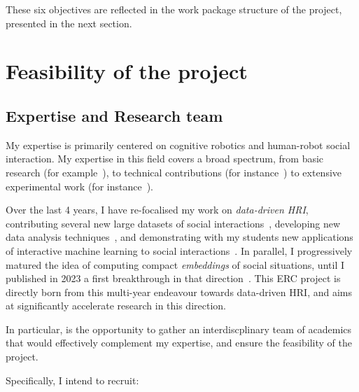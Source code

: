 These six objectives are reflected in the work package structure of the project,
presented in the next section.


\section{Feasibility of the project}


\subsection{Expertise and Research team}
\label{research-team}

My expertise is primarily centered on cognitive robotics and human-robot social
interaction. My expertise in this field covers a broad spectrum, from basic
research (for
example~\cite{lemaignan2014dynamics,lemaignan2015mutual,irfan2018social,winkle2019effective,bartlett2019what}),
to technical contributions (for instance~\cite{lemaignan2010oro,
lemaignan2017artificial, lemaignan2018underworlds})
to extensive experimental work (for instance~\cite{hood2015cowriter,winkle2020couch,
lemaignan2022social}).

Over the last 4 years, I have re-focalised my work on \emph{data-driven HRI},
contributing several new large datasets of social
interactions~\cite{lemaignan2018pinsoro,sallami2020unexpected,webb2023sogrin},
developing new data analysis
techniques~\cite{bartlett2019what,webb2022measuring}, and demonstrating with my
students new applications of interactive machine learning to social
interactions~\cite{senft2016sparc,winkle2020couch,winkle2021leador}.
In parallel, I progressively matured the idea of computing compact
\emph{embeddings} of social situations, until I published in 2023 a first
breakthrough in that direction~\cite{lemaignan2024social}. This ERC project is
directly born from this multi-year endeavour towards data-driven HRI, and aims
at significantly accelerate research in this direction.

In particular, \project is the opportunity to gather an interdiscplinary team of
academics that would effectively complement my expertise, and ensure the
feasibility of the project.

Specifically, I intend to recruit:


